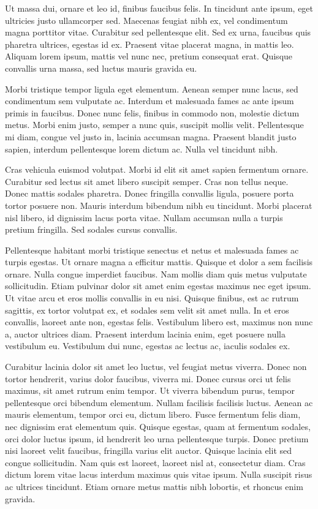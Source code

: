 Ut massa dui, ornare et leo id, finibus faucibus felis. In tincidunt ante ipsum, eget ultricies justo ullamcorper sed. Maecenas feugiat nibh ex, vel condimentum magna porttitor vitae. Curabitur sed pellentesque elit. Sed ex urna, faucibus quis pharetra ultrices, egestas id ex. Praesent vitae placerat magna, in mattis leo. Aliquam lorem ipsum, mattis vel nunc nec, pretium consequat erat. Quisque convallis urna massa, sed luctus mauris gravida eu.

Morbi tristique tempor ligula eget elementum. Aenean semper nunc lacus, sed condimentum sem vulputate ac. Interdum et malesuada fames ac ante ipsum primis in faucibus. Donec nunc felis, finibus in commodo non, molestie dictum metus. Morbi enim justo, semper a nunc quis, suscipit mollis velit. Pellentesque mi diam, congue vel justo in, lacinia accumsan magna. Praesent blandit justo sapien, interdum pellentesque lorem dictum ac. Nulla vel tincidunt nibh.

Cras vehicula euismod volutpat. Morbi id elit sit amet sapien fermentum ornare. Curabitur sed lectus sit amet libero suscipit semper. Cras non tellus neque. Donec mattis sodales pharetra. Donec fringilla convallis ligula, posuere porta tortor posuere non. Mauris interdum bibendum nibh eu tincidunt. Morbi placerat nisl libero, id dignissim lacus porta vitae. Nullam accumsan nulla a turpis pretium fringilla. Sed sodales cursus convallis.

Pellentesque habitant morbi tristique senectus et netus et malesuada fames ac turpis egestas. Ut ornare magna a efficitur mattis. Quisque et dolor a sem facilisis ornare. Nulla congue imperdiet faucibus. Nam mollis diam quis metus vulputate sollicitudin. Etiam pulvinar dolor sit amet enim egestas maximus nec eget ipsum. Ut vitae arcu et eros mollis convallis in eu nisi. Quisque finibus, est ac rutrum sagittis, ex tortor volutpat ex, et sodales sem velit sit amet nulla. In et eros convallis, laoreet ante non, egestas felis. Vestibulum libero est, maximus non nunc a, auctor ultrices diam. Praesent interdum lacinia enim, eget posuere nulla vestibulum eu. Vestibulum dui nunc, egestas ac lectus ac, iaculis sodales ex.

Curabitur lacinia dolor sit amet leo luctus, vel feugiat metus viverra. Donec non tortor hendrerit, varius dolor faucibus, viverra mi. Donec cursus orci ut felis maximus, sit amet rutrum enim tempor. Ut viverra bibendum purus, tempor pellentesque orci bibendum elementum. Nullam facilisis facilisis luctus. Aenean ac mauris elementum, tempor orci eu, dictum libero. Fusce fermentum felis diam, nec dignissim erat elementum quis. Quisque egestas, quam at fermentum sodales, orci dolor luctus ipsum, id hendrerit leo urna pellentesque turpis. Donec pretium nisi laoreet velit faucibus, fringilla varius elit auctor. Quisque lacinia elit sed congue sollicitudin. Nam quis est laoreet, laoreet nisl at, consectetur diam. Cras dictum lorem vitae lacus interdum maximus quis vitae ipsum. Nulla suscipit risus ac ultrices tincidunt. Etiam ornare metus mattis nibh lobortis, et rhoncus enim gravida.

